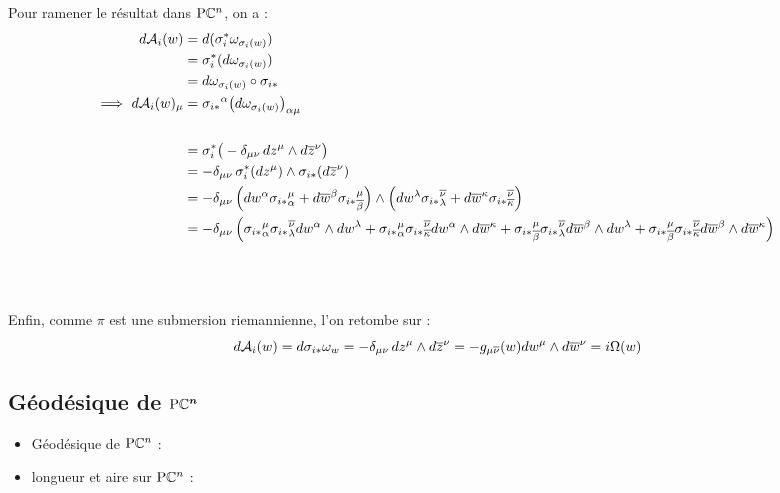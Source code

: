 Pour ramener le résultat dans $\text{\normalfont P}\mathbb{C}^{n}$, on a :
\begin{align*}
	d\mathcal{A}_i(w) &= d(\sigma_i^* \omega_{\sigma_i(w)}) \\
	&= \sigma_i^* (d\omega_{\sigma_i(w)}) \\
	&= d\omega_{\sigma_i(w)}\circ \sigma_{i*}  \\
	\Longrightarrow\ d\mathcal{A}_i(w)_\mu &= {\sigma_{i*}}^\alpha \big( d\omega_{\sigma_i(w)} \big)_{\alpha\mu}
	\\ \\
	&= \sigma_i^* \big( -\delta_{\mu \nu}\, dz^\mu \wedge d\overline{z}^\nu \big) \\
	&= -\delta_{\mu \nu}\, \sigma_i^* (dz^\mu) \wedge \sigma_{i*}(d\overline{z}^\nu) \\
	&= -\delta_{\mu \nu}\,  \Big( 
		dw^\alpha {\sigma_{i*}}_{\alpha}^\mu + d\overline{w}^\beta {\sigma_{i*}}_{\overline{\beta}}^\mu 
		\Big) \wedge \Big(
		dw^\lambda {\sigma_{i*}}_{\lambda}^{\overline{\nu}} + d\overline{w}^\kappa {\sigma_{i*}}_{\overline{\kappa}}^{\overline{\nu}} \Big) \\
	&= -\delta_{\mu \nu}\,  \Big(
		{\sigma_{i*}}_{\alpha}^\mu {\sigma_{i*}}_{\lambda}^{\overline{\nu}} 
		dw^\alpha \wedge dw^\lambda + 
		{\sigma_{i*}}_{\alpha}^\mu {\sigma_{i*}}_{\overline{\kappa}}^{\overline{\nu}}
		dw^\alpha \wedge d\overline{w}^\kappa + 
		{\sigma_{i*}}_{\overline{\beta}}^\mu {\sigma_{i*}}_{\lambda}^{\overline{\nu}}
		d\overline{w}^\beta  \wedge dw^\lambda +
		{\sigma_{i*}}_{\overline{\beta}}^\mu {\sigma_{i*}}_{\overline{\kappa}}^{\overline{\nu}} 
		d\overline{w}^\beta \wedge d\overline{w}^\kappa 
		\Big) \\
\end{align*}
\\ \\ \\
Enfin, comme $\pi$ est une submersion riemannienne, l'on retombe sur :
\[d\mathcal{A}_i(w) = d\sigma_{i*}\omega_w = -\delta_{\mu \nu}\, dz^\mu \wedge d\overline{z}^\nu = -g_{\mu \overline{\nu}}(w) dw^\mu \wedge d\overline{w}^\nu = i\Omega(w)\]
\skipl


\subsection{Géodésique de $\boldsymbol{\text{\normalfont P}\mathbb{C}^{n}}$} \label{ann:geode2PC^n}

\begin{itemize}
	
	\item Géodésique de $\text{\normalfont P}\mathbb{C}^{n}$ : \cite[sec. 3.E]{besse_manifolds_1978}
	
	\item longueur et aire sur $\text{\normalfont P}\mathbb{C}^{n}$ : \cite[p. 119]{huybrechts_complex_2005}
	
\end{itemize}


